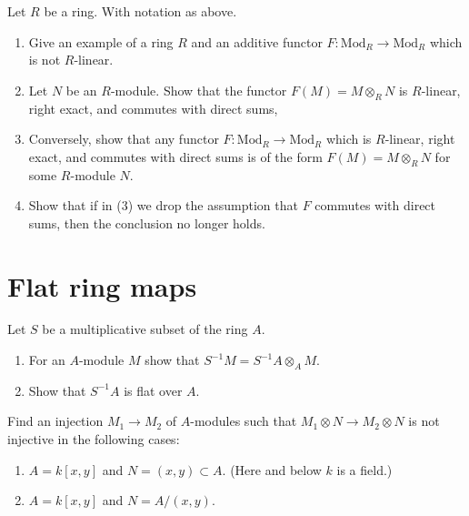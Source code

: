\begin{exercise}
\label{exercise-characterize-tensor-functor}
Let $R$ be a ring. With notation as above.
\begin{enumerate}
\item Give an example of a ring $R$ and an additive functor
$F : \text{Mod}_R \to \text{Mod}_R$ which is not $R$-linear.
\item Let $N$ be an $R$-module. Show that the functor
$F(M) = M \otimes_R N$ is $R$-linear,
right exact, and commutes with direct sums,
\item Conversely, show that any functor $F : \text{Mod}_R \to \text{Mod}_R$
which is $R$-linear,
right exact, and commutes with direct sums is of the
form $F(M) = M \otimes_R N$ for some $R$-module $N$.
\item Show that if in (3) we drop the assumption
that $F$ commutes with direct sums, then the conclusion no
longer holds.
\end{enumerate}
\end{exercise}





\section{Flat ring maps}
\label{section-flat}

\begin{exercise}
\label{exercise-localization-flat}
Let $S$ be a multiplicative subset of the ring $A$.
\begin{enumerate}
\item For an $A$-module $M$ show that $S^{-1}M = S^{-1}A \otimes_A M$.
\item Show that $S^{-1}A$ is flat over $A$.
\end{enumerate}
\end{exercise}

\begin{exercise}
\label{exercise-examples-not-flat}
Find an injection $M_1 \to M_2$ of $A$-modules such that
$M_1\otimes N \to M_2 \otimes N$ is not injective in the following
cases:
\begin{enumerate}
\item $A = k[x, y]$ and $N = (x, y) \subset A$. (Here and below $k$ is a field.)
\item $A = k[x, y]$ and $N = A/(x, y)$.
\end{enumerate}
\end{exercise}

